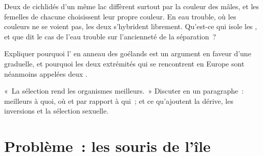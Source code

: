 \begin{exercise}[$\star\star\star$]\label{exo:g12:selection-drift-speciation:13}
Deux  de cichlidés d'un même lac diffèrent surtout par la
couleur des mâles, et les femelles de chacune choisissent leur propre
couleur. En eau trouble, où les couleurs ne se voient pas, les deux
s'hybrident librement. Qu'est-ce qui isole les , et que dit le
cas de l'eau trouble sur l'ancienneté de la séparation~?
\end{exercise}

\begin{exercise}[$\star\star\star$]\label{exo:g12:selection-drift-speciation:14}
Expliquer pourquoi l' en anneau des goélands est un argument en
faveur d'une  graduelle, et pourquoi les deux extrémités qui
se rencontrent en Europe sont néanmoins appelées deux .
\end{exercise}

\begin{exercise}[$\star\star\star$]\label{exo:g12:selection-drift-speciation:15}
«~La sélection rend les organismes meilleurs.~» Discuter en un
paragraphe~: meilleurs à quoi, où et par rapport à qui~; et ce
qu'ajoutent la dérive, les inversions et la sélection sexuelle.
\end{exercise}

\section{Problème~: les souris de l'île}

